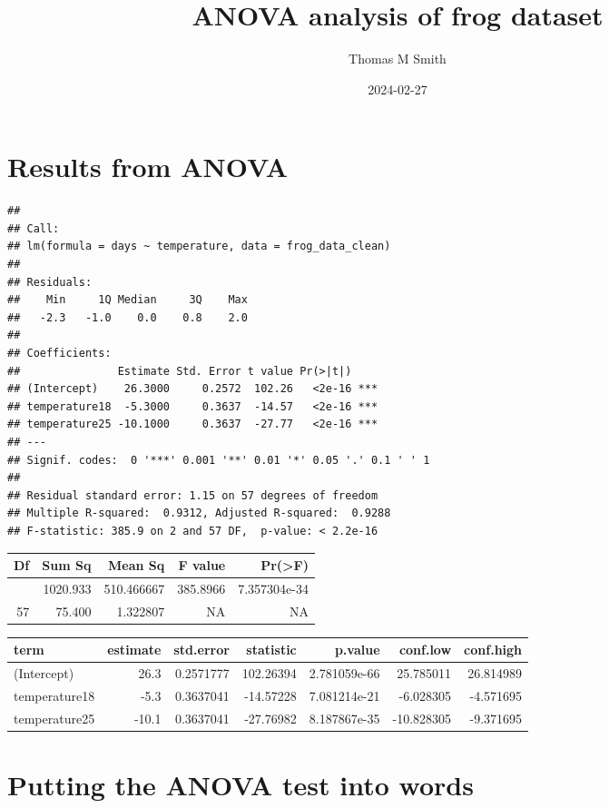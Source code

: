 \documentclass[
]{article}
\title{ANOVA analysis of frog dataset}
\author{Thomas M Smith}
\date{2024-02-27}
\begin{document}
\maketitle

\hypertarget{results-from-anova}{%
\section{Results from ANOVA}\label{results-from-anova}}

\begin{verbatim}
## 
## Call:
## lm(formula = days ~ temperature, data = frog_data_clean)
## 
## Residuals:
##    Min     1Q Median     3Q    Max 
##   -2.3   -1.0    0.0    0.8    2.0 
## 
## Coefficients:
##               Estimate Std. Error t value Pr(>|t|)    
## (Intercept)    26.3000     0.2572  102.26   <2e-16 ***
## temperature18  -5.3000     0.3637  -14.57   <2e-16 ***
## temperature25 -10.1000     0.3637  -27.77   <2e-16 ***
## ---
## Signif. codes:  0 '***' 0.001 '**' 0.01 '*' 0.05 '.' 0.1 ' ' 1
## 
## Residual standard error: 1.15 on 57 degrees of freedom
## Multiple R-squared:  0.9312, Adjusted R-squared:  0.9288 
## F-statistic: 385.9 on 2 and 57 DF,  p-value: < 2.2e-16
\end{verbatim}

\begin{longtable}{rrrrr}
\toprule
Df & Sum Sq & Mean Sq & F value & Pr(>F) \\ 
\midrule\addlinespace[2.5pt]
2 & 1020.933 & 510.466667 & 385.8966 & 7.357304e-34 \\ 
57 & 75.400 & 1.322807 & NA & NA \\ 
\bottomrule
\end{longtable}
\begin{longtable}{lrrrrrr}
\toprule
term & estimate & std.error & statistic & p.value & conf.low & conf.high \\ 
\midrule\addlinespace[2.5pt]
(Intercept) & 26.3 & 0.2571777 & 102.26394 & 2.781059e-66 & 25.785011 & 26.814989 \\ 
temperature18 & -5.3 & 0.3637041 & -14.57228 & 7.081214e-21 & -6.028305 & -4.571695 \\ 
temperature25 & -10.1 & 0.3637041 & -27.76982 & 8.187867e-35 & -10.828305 & -9.371695 \\ 
\bottomrule
\end{longtable}

\hypertarget{putting-the-anova-test-into-words}{%
\section{Putting the ANOVA test into
words}\label{putting-the-anova-test-into-words}}
\end{document}
